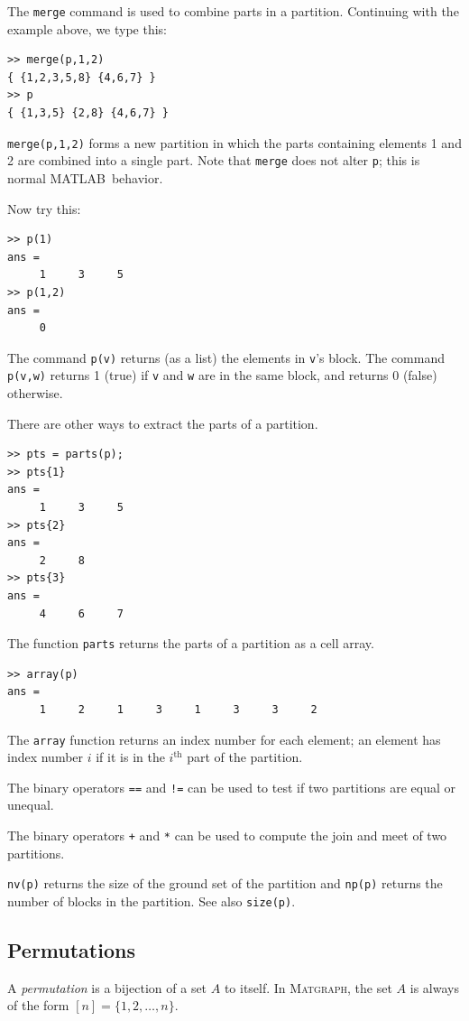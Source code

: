 \documentclass[12pt]{amsart}
\newcommand\matlab{MATLAB}
\newcommand\matgraph{\textsc{Matgraph}}
\begin{document}
The \verb|merge| command is used to combine parts in a
partition. Continuing with the example above, we type this:
\begin{verbatim}
>> merge(p,1,2)
{ {1,2,3,5,8} {4,6,7} }
>> p
{ {1,3,5} {2,8} {4,6,7} }
\end{verbatim}
\verb|merge(p,1,2)| forms a new partition in which the parts
containing elements 1 and 2 are combined into a single part. Note that
\verb|merge| does not alter \verb|p|; this is normal \matlab\
behavior. 


Now try this:
\begin{verbatim}
>> p(1)
ans =
     1     3     5
>> p(1,2)
ans =
     0
\end{verbatim}
The command \verb|p(v)| returns (as a list) the elements in \verb|v|'s
block. The command \verb|p(v,w)| returns 1 (true) if \verb|v| and
\verb|w| are in the same block, and returns 0 (false) otherwise. 

There are other ways to extract the parts of a partition. 
\begin{verbatim}
>> pts = parts(p);
>> pts{1}
ans =
     1     3     5
>> pts{2}
ans =
     2     8
>> pts{3}
ans =
     4     6     7
\end{verbatim}
The function \verb|parts| returns the parts of a partition as a cell
array.
\begin{verbatim}
>> array(p)
ans =
     1     2     1     3     1     3     3     2
\end{verbatim}
The \verb|array| function returns an index number for each element; an
element has index number $i$ if it is in the $i^{\text{th}}$ part of
the partition.

The binary operators \verb|==| and \verb|!=| can be used to test if
two partitions are equal or unequal. 

The binary operators \verb|+| and \verb|*| can be used to compute the
join and meet of two partitions. 

\verb|nv(p)| returns the size of the ground set of the partition and
\verb|np(p)| returns the number of blocks in the partition. See also
\verb|size(p)|. 


\subsection{Permutations}

A \emph{permutation} is a bijection of a set $A$ to itself. In
\matgraph, the set $A$ is always of the form $[n] = \{1,2,\ldots,
n\}$.
\end{document}
